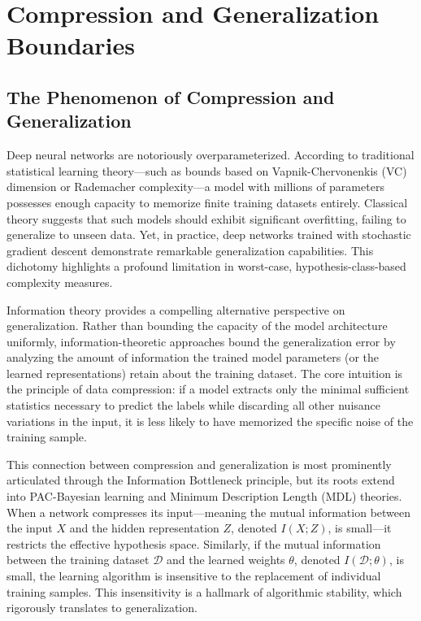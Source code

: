 \chapter{Compression and Generalization Boundaries}
\label{ch:compression_bounds}

\section{The Phenomenon of Compression and Generalization}

Deep neural networks are notoriously overparameterized. According to traditional statistical learning theory---such as bounds based on Vapnik-Chervonenkis (VC) dimension or Rademacher complexity---a model with millions of parameters possesses enough capacity to memorize finite training datasets entirely. Classical theory suggests that such models should exhibit significant overfitting, failing to generalize to unseen data. Yet, in practice, deep networks trained with stochastic gradient descent demonstrate remarkable generalization capabilities. This dichotomy highlights a profound limitation in worst-case, hypothesis-class-based complexity measures.

Information theory provides a compelling alternative perspective on generalization. Rather than bounding the capacity of the model architecture uniformly, information-theoretic approaches bound the generalization error by analyzing the amount of information the trained model parameters (or the learned representations) retain about the training dataset. The core intuition is the principle of data compression: if a model extracts only the minimal sufficient statistics necessary to predict the labels while discarding all other nuisance variations in the input, it is less likely to have memorized the specific noise of the training sample.

This connection between compression and generalization is most prominently articulated through the Information Bottleneck principle, but its roots extend into PAC-Bayesian learning and Minimum Description Length (MDL) theories. When a network compresses its input---meaning the mutual information between the input $X$ and the hidden representation $Z$, denoted $I(X; Z)$, is small---it restricts the effective hypothesis space. Similarly, if the mutual information between the training dataset $\mathcal{D}$ and the learned weights $\theta$, denoted $I(\mathcal{D}; \theta)$, is small, the learning algorithm is insensitive to the replacement of individual training samples. This insensitivity is a hallmark of algorithmic stability, which rigorously translates to generalization.

